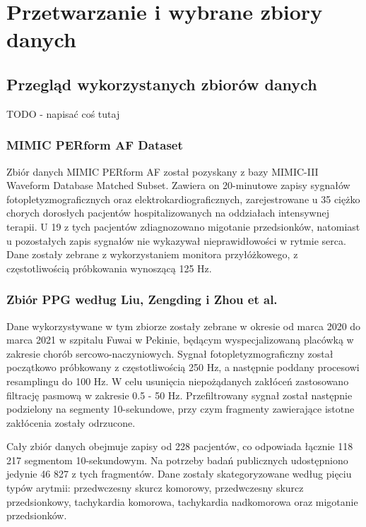 \documentclass[a4paper,twoside,12pt]{book}
\begin{document}
\chapter{Przetwarzanie i wybrane zbiory danych}
\section{Przegląd wykorzystanych zbiorów danych}
TODO - napisać coś tutaj
\subsection{MIMIC PERform AF Dataset}
Zbiór danych MIMIC PERform AF\cite{mimic_perform_af} został pozyskany z bazy MIMIC-III Waveform Database Matched Subset\cite{mimiciii_waveform_matched}. Zawiera on 20-minutowe zapisy sygnałów fotopletyzmograficznych oraz elektrokardiograficznych, zarejestrowane u 35 ciężko chorych dorosłych pacjentów hospitalizowanych na oddziałach intensywnej terapii. U 19 z tych pacjentów zdiagnozowano migotanie przedsionków, natomiast u pozostałych zapis sygnałów nie wykazywał nieprawidłowości w rytmie serca. Dane zostały zebrane z wykorzystaniem monitora przyłóżkowego, z częstotliwością próbkowania wynoszącą 125 Hz.

\subsection{Zbiór PPG według Liu, Zengding i Zhou et al.}
Dane wykorzystywane w tym zbiorze\cite{liu2022multiclass} zostały zebrane w okresie od marca 2020 do marca 2021 w szpitalu Fuwai w Pekinie, będącym wyspecjalizowaną placówką w zakresie chorób sercowo-naczyniowych. Sygnał fotopletyzmograficzny został początkowo próbkowany z częstotliwością 250 Hz, a następnie poddany procesowi resamplingu do 100 Hz. W celu usunięcia niepożądanych zakłóceń zastosowano filtrację pasmową w zakresie 0.5 - 50 Hz. Przefiltrowany sygnał został następnie podzielony na segmenty 10-sekundowe, przy czym fragmenty zawierające istotne zakłócenia zostały odrzucone.


Cały zbiór danych obejmuje zapisy od 228 pacjentów, co odpowiada łącznie 118 217 segmentom 10-sekundowym. Na potrzeby badań publicznych udostępniono jedynie 46 827 z tych fragmentów. Dane zostały skategoryzowane według pięciu typów arytmii: przedwczesny skurcz komorowy, przedwczesny skurcz przedsionkowy, tachykardia komorowa, tachykardia nadkomorowa oraz migotanie przedsionków.
\end{document}

